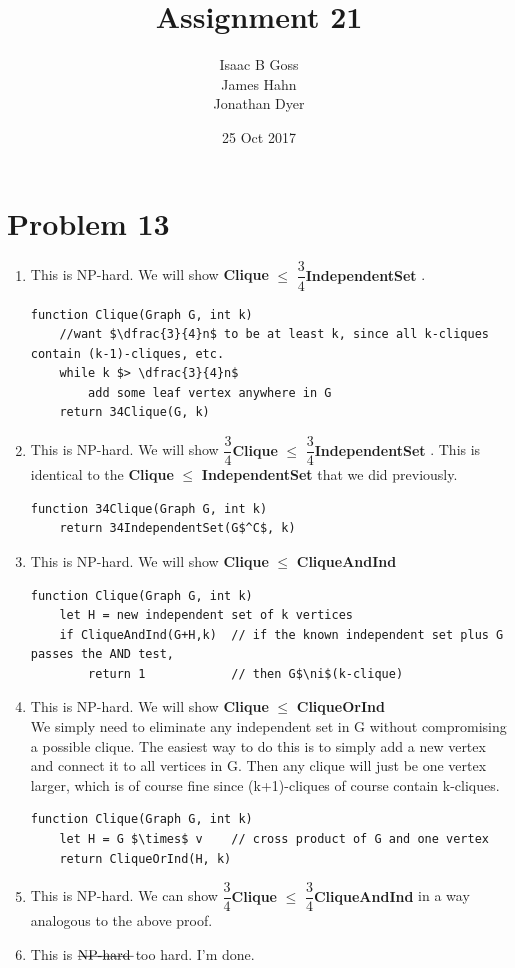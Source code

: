\documentclass{article}
\author{Isaac B Goss\\ James Hahn\\ Jonathan Dyer}
\title{Assignment 21}
\date{25 Oct 2017}
\providecommand{\prob}[1]{\section*{Problem #1}}
\providecommand{\reducible}[2]{
  \textbf{#1} $\leq$ \textbf{#2}
}
\begin{document}
\maketitle

\prob{13}
\begin{enumerate}[label=(\alph*)]
 \item This is NP-hard. We will show \reducible{Clique}{$\dfrac{3}{4}$IndependentSet}.
       \begin{lstlisting}
function Clique(Graph G, int k)
    //want $\dfrac{3}{4}n$ to be at least k, since all k-cliques contain (k-1)-cliques, etc.
    while k $> \dfrac{3}{4}n$
        add some leaf vertex anywhere in G
    return 34Clique(G, k)
 \end{lstlisting}

 \item This is NP-hard. We will show \reducible{$\dfrac{3}{4}$Clique}{$\dfrac{3}{4}$IndependentSet}. This is identical to the \reducible{Clique}{IndependentSet} that we did previously.
       \begin{lstlisting}
function 34Clique(Graph G, int k)
    return 34IndependentSet(G$^C$, k)
  \end{lstlisting}

 \item This is NP-hard. We will show \reducible{Clique}{CliqueAndInd}
       \begin{lstlisting}
function Clique(Graph G, int k)
    let H = new independent set of k vertices
    if CliqueAndInd(G+H,k)  // if the known independent set plus G passes the AND test,
        return 1            // then G$\ni$(k-clique)
  \end{lstlisting}

 \item This is NP-hard. We will show  \reducible{Clique}{CliqueOrInd}\\
       We simply need to eliminate any independent set in G without compromising a possible clique.
       The easiest way to do this is to simply add a new vertex and connect it to all vertices in G.
       Then any clique will just be one vertex larger, which is of course fine since (k+1)-cliques of course contain k-cliques.
       \begin{lstlisting}
function Clique(Graph G, int k)
    let H = G $\times$ v    // cross product of G and one vertex
    return CliqueOrInd(H, k)
       \end{lstlisting}

 \item This is NP-hard. We can show \reducible{$\dfrac{3}{4}$Clique}{$\dfrac{3}{4}$CliqueAndInd} in a way analogous to the above proof.

 \item This is $\rule[0.5ex]{4em}{0.1ex}\hspace{-4em}\text{NP-hard}$ too hard. I'm done.
\end{enumerate}
\end{document}
